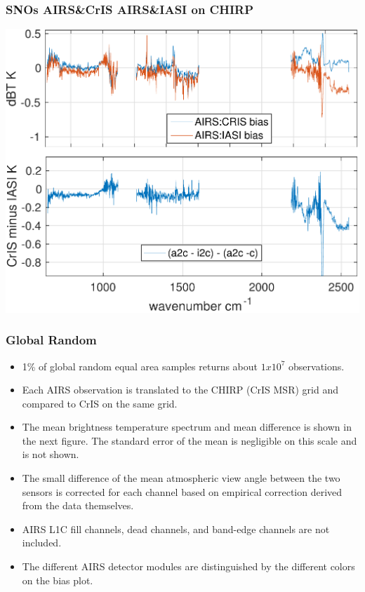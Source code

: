 \documentclass[10pt,t]{beamer}
\begin{document}
\begin{frame}
  \frametitle{SNOs AIRS\&CrIS AIRS\&IASI on CHIRP}
  
  \begin{center}
   \includegraphics[width=0.8\linewidth]{./Figs/Pdf/ac_ai_2017_sno_msr_dble_diff_bias_aslp.pdf}
  \end{center}

\end{frame}

\begin{frame}
  \frametitle{Global Random}
  \begin{itemize}
    \item 1\% of global random equal area samples returns about $1 x 10^7$ observations.
    \item Each AIRS observation is translated to the CHIRP (CrIS MSR) grid and compared to  CrIS on the same grid.
    \item The mean brightness temperature spectrum and mean difference is shown in the next figure. The standard error of the mean is negligible on this scale and is not shown.
      \item The small difference of the mean atmospheric view angle between the two sensors is corrected for each channel based on empirical correction derived from the data themselves.
    \item AIRS L1C fill channels, dead channels, and band-edge channels are not included.
      \item The different AIRS detector modules are distinguished by the different colors on the bias plot.
  \end{itemize}

\end{frame}
  
\end{document}
